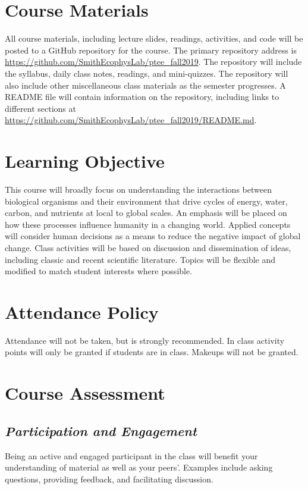 \documentclass[12pt, notitlepage]{article}   	%
\begin{document}
{\section{Course Materials}
All course materials, including lecture slides, readings, activities, and code 
will be posted to a GitHub repository for the course.
The primary repository address is
\url{https://github.com/SmithEcophysLab/ptee_fall2019}.
The repository will include the syllabus, daily class notes, readings, and mini-quizzes.
The repository will also include other miscellaneous class materials as the semester
progresses. A README file will contain information on the repository, including
links to different sections at 
\url{https://github.com/SmithEcophysLab/ptee_fall2019/README.md}.

\section{Learning Objective}
This course will broadly focus on understanding the interactions between biological
organisms and their environment that drive cycles of energy, water, carbon, and nutrients
at local to global scales.
An emphasis will be placed on how these processes influence humanity in a changing world.
Applied concepts will consider human decisions as a means to reduce the negative impact
of global change. Class activities will be based on discussion and dissemination of ideas, 
including classic and recent scientific literature. 
Topics will be flexible and modified to match student interests where possible.

\section{Attendance Policy}
Attendance will not be taken, but is strongly recommended. 
In class activity points will only be granted if students are in class.
Makeups will not be granted.

\section{Course Assessment}
\subsection{\textit{Participation and Engagement}}
Being an active and engaged participant in the class will benefit your understanding
of material as well as your peers'. Examples include asking questions, providing feedback,
and facilitating discussion.

}
\end{document}

